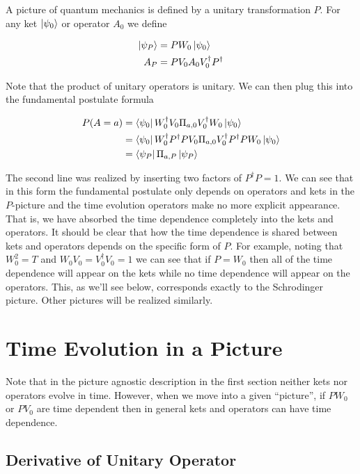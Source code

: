 \documentclass[12pt]{article}
\begin{document}
A picture of quantum mechanics is defined by a unitary transformation $P$.  For any ket $\ket{\psi_0}$ or operator $A_0$ we define

\begin{align}
\ket{\psi_P} &= P W_0\ket{\psi_0}\\
A_P &= P V_0 A_0 V_0^{\dag} P^{\dag}
\end{align}

Note that the product of unitary operators is unitary. We can then plug this into the fundamental postulate formula

\begin{align}
P(A=a) &= \bra{\psi_0}W_0^{\dag}V_0\Pi_{a,0} V_0^{\dag}W_0 \ket{\psi_0}\\
&= \bra{\psi_0} W_0^{\dag} P^{\dag} P V_0 \Pi_{a,0} V_0^{\dag} P^{\dag} P W_0 \ket{\psi_0}\\
&= \bra{\psi_P} \Pi_{a,P} \ket{\psi_P}
\end{align}

The second line was realized by inserting two factors of $P^{\dag} P = 1$. We can see that in this form the fundamental postulate only depends on operators and kets in the $P$-picture and the time evolution operators make no more explicit appearance. That is, we have absorbed the time dependence completely into the kets and operators. It should be clear that how the time dependence is shared between kets and operators depends on the specific form of $P$. For example, noting that $W_0^2 = T$ and $W_0V_0 = V_0^{\dag}V_0 =1$ we can see that if $P=W_0$ then all of the time dependence will appear on the kets while no time dependence will appear on the operators. This, as we'll see below, corresponds exactly to the Schrodinger picture. Other pictures will be realized similarly.

\section{Time Evolution in a Picture}

Note that in the picture agnostic description in the first section neither kets nor operators evolve in time. However, when we move into a given ``picture'', if $PW_0$ or $PV_0$ are time dependent then in general kets and operators can have time dependence.

\subsection{Derivative of Unitary Operator}
\end{document}
